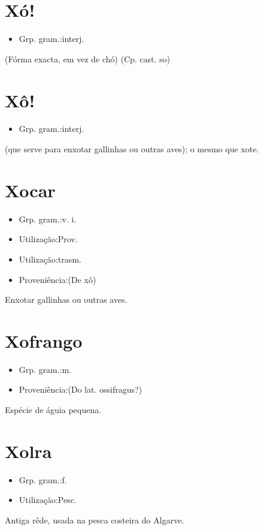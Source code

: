 \section{Xó!}
\begin{itemize}
\item {Grp. gram.:interj.}
\end{itemize}
(Fórma exacta, em vez de \textunderscore chó\textunderscore )
(Cp. cast. \textunderscore so\textunderscore )
\section{Xô!}
\begin{itemize}
\item {Grp. gram.:interj.}
\end{itemize}
(que serve para enxotar gallinhas ou outras aves); o mesmo que \textunderscore xote\textunderscore .
\section{Xocar}
\begin{itemize}
\item {Grp. gram.:v. i.}
\end{itemize}
\begin{itemize}
\item {Utilização:Prov.}
\end{itemize}
\begin{itemize}
\item {Utilização:trasm.}
\end{itemize}
\begin{itemize}
\item {Proveniência:(De \textunderscore xô\textunderscore )}
\end{itemize}
Enxotar gallinhas ou outras aves.
\section{Xofrango}
\begin{itemize}
\item {Grp. gram.:m.}
\end{itemize}
\begin{itemize}
\item {Proveniência:(Do lat. \textunderscore ossifragus\textunderscore ?)}
\end{itemize}
Espécie de águia pequena.
\section{Xolra}
\begin{itemize}
\item {Grp. gram.:f.}
\end{itemize}
\begin{itemize}
\item {Utilização:Pesc.}
\end{itemize}
Antiga rêde, usada na pesca costeira do Algarve.
